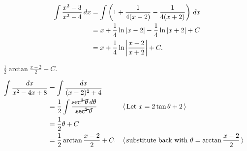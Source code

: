     \begin{align*}
        \int \frac{x^2-3}{x^2-4} \, dx
            &= \int \left( 1 + \frac{1}{4(x-2)} - \frac{1}{4(x+2)} \right) \, dx \\
            &= x + \frac{1}{4} \ln|x-2| - \frac{1}{4} \ln|x+2| + C \\
            &= x + \frac{1}{4} \ln\left\lvert \frac{x-2}{x+2} \right\rvert + C.
    \end{align*}
    \newpage
    
    {$ \frac{1}{2} \arctan \frac{x-2}{2} + C $.}
    
    \begin{align*}
        \int \frac{dx}{x^2 - 4x + 8}
            &= \int \frac{dx}{(x-2)^2 + 4} \\
            &= \frac{1}{2} \int \frac{\cancel{\sec^2 \theta} \, d\theta}
                {\cancel{\sec^2 \theta}}
                && \langle \, \text{Let $ x = 2\tan \theta + 2 $} \, \rangle \\
            &= \frac{1}{2} \theta + C \\
            &= \frac{1}{2} \arctan \frac{x-2}{2} + C.
                && \langle \, \text{substitute back with $ \theta =
                    \arctan \frac{x-2}{2} $} \, \rangle
    \end{align*}
